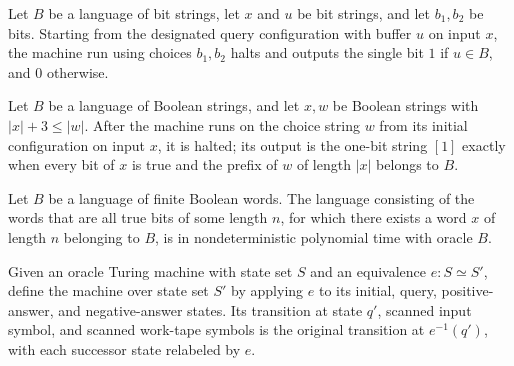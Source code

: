 \begin{theorem}
\label{Complexity.uw_tail}
\leanok
{}
Let $B$ be a language of bit strings, let $x$ and $u$ be bit strings, and let $b_1,b_2$
be bits. Starting from the designated query configuration with buffer $u$ on input $x$,
the machine run using choices $b_1,b_2$ halts and outputs the single bit $1$ if $u\in
B$, and $0$ otherwise.
\end{theorem}

\begin{theorem}
\label{Complexity.uw_branch}
\leanok
{}
Let $B$ be a language of Boolean strings, and let $x,w$ be Boolean strings with
$|x|+3\le |w|$. After the machine runs on the choice string $w$ from its initial
configuration on input $x$, it is halted; its output is the one-bit string $[1]$ exactly
when every bit of $x$ is true and the prefix of $w$ of length $|x|$ belongs to $B$.
\end{theorem}

\begin{theorem}
\label{Complexity.unaryWitnessLang_mem_NPOracle}
\leanok
{}
Let $B$ be a language of finite Boolean words. The language consisting of the words that
are all true bits of some length $n$, for which there exists a word $x$ of length $n$
belonging to $B$, is in nondeterministic polynomial time with oracle $B$.
\end{theorem}

\begin{definition}
\label{Turing.OracleTM.relabel}
\leanok
{}
Given an oracle Turing machine with state set $S$ and an equivalence $e:S\simeq S'$,
define the machine over state set $S'$ by applying $e$ to its initial, query,
positive-answer, and negative-answer states. Its transition at state $q'$, scanned input
symbol, and scanned work-tape symbols is the original transition at $e^{-1}(q')$, with
each successor state relabeled by $e$.
\end{definition}

